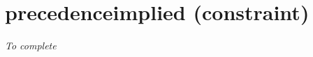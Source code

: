 \section{precedenceimplied (constraint)}\label{precedenceimplied:precedenceimpliedconstraint}\hypertarget{precedenceimplied:precedenceimpliedconstraint}{}
\emph{To complete}
